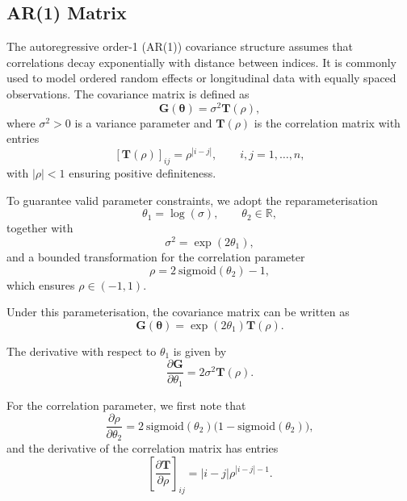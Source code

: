 \documentclass[
  letterpaper,
  DIV=11,
  numbers=noendperiod]{scrartcl}
\begin{document}
\subsection{AR(1) Matrix}\label{ar1-matrix}

The autoregressive order-1 (AR(1)) covariance structure assumes that
correlations decay exponentially with distance between indices. It is
commonly used to model ordered random effects or longitudinal data with
equally spaced observations. The covariance matrix is defined as
\begin{equation}
\symbf{G}(\symbf{\theta}) = \sigma^2 \symbf{T}(\rho),
\end{equation} where \(\sigma^2 > 0\) is a variance parameter and
\(\symbf{T}(\rho)\) is the correlation matrix with entries
\begin{equation}
\left[\symbf{T}(\rho)\right]_{ij} = \rho^{|i-j|}, \qquad i,j = 1,\ldots,n,
\end{equation} with \(|\rho| < 1\) ensuring positive definiteness.

To guarantee valid parameter constraints, we adopt the
reparameterisation \begin{equation}
\theta_1 = \log(\sigma), \qquad \theta_2 \in \mathbb{R},
\end{equation} together with \begin{equation}
\sigma^2 = \exp(2\theta_1),
\end{equation} and a bounded transformation for the correlation
parameter \begin{equation}
\rho = 2~\mathrm{sigmoid}(\theta_2) - 1,
\end{equation} which ensures \(\rho \in (-1,1)\).

Under this parameterisation, the covariance matrix can be written as
\begin{equation}
\symbf{G}(\symbf{\theta}) = \exp(2\theta_1)\symbf{T}(\rho).
\end{equation}

The derivative with respect to \(\theta_1\) is given by \begin{equation}
\frac{\partial \symbf{G}}{\partial \theta_1}
= 2\sigma^2 \symbf{T}(\rho).
\end{equation}

For the correlation parameter, we first note that \begin{equation}
\frac{\partial \rho}{\partial \theta_2}
= 2~\mathrm{sigmoid}(\theta_2)\big(1 - \mathrm{sigmoid}(\theta_2)\big),
\end{equation} and the derivative of the correlation matrix has entries
\begin{equation}
\left[\frac{\partial \symbf{T}}{\partial \rho}\right]_{ij}
= |i-j| \rho^{|i-j|-1}.
\end{equation}
\end{document}
